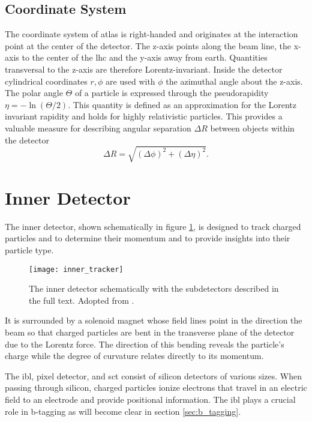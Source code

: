 \subsection*{Coordinate System}
The coordinate system of \ac{atlas} is right-handed and originates at the interaction point at the center of the detector. The z-axis points along the beam line, the x-axis to the center of the \ac{lhc} and the y-axis away from earth. Quantities transversal to the z-axis are therefore Lorentz-invariant. Inside the detector cylindrical coordinates $r,\phi$ are used with $\phi$ the azimuthal angle about the z-axis. The polar angle $\Theta$ of a particle is expressed through the pseudorapidity $\eta=-\ln(\Theta/2)$. This quantity is defined as an approximation for the Lorentz invariant rapidity and holds for highly relativistic particles. This provides a valuable measure for describing angular separation $\Delta R$ between objects within the detector
\begin{equation}
    \Delta R = \sqrt{(\Delta\phi)^2+(\Delta \eta)^2}.
    \label{eq:delta_R}
\end{equation}

\section{Inner Detector}\label{sec:inner_detector}
The inner detector, shown schematically in figure \ref{fig:inner_tracker}, is designed to track charged particles and to determine their momentum and to provide insights into their particle type.
\begin{figure}
    \centering
    \texttt{[image: inner\_tracker]}
    \caption[]{The inner detector schematically with the subdetectors described in the full text. Adopted from \citep{Potamianos:2016ptf}.}
    \label{fig:inner_tracker}
\end{figure}
It is surrounded by a solenoid magnet whose field lines point in the direction the beam so that charged particles are bent in the transverse plane of the detector due to the Lorentz force. The direction of this bending reveals the particle's charge while the degree of curvature relates directly to its momentum.

The \ac{ibl}, pixel detector, and \ac{sct} consist of silicon detectors of various sizes. When passing through silicon, charged particles ionize electrons that travel in an electric field to an electrode and provide positional information. The \ac{ibl} plays a crucial role in b-tagging as will become clear in section \ref{sec:b_tagging}.

